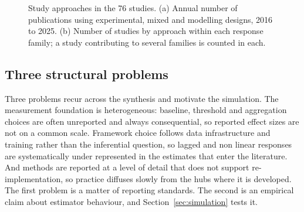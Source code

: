 \begin{figure}[H]\centering
{}\hfill{}
\caption{Study approaches in the 76 studies. (a) Annual number of publications using experimental, mixed and modelling designs, 2016 to 2025. (b) Number of studies by approach within each response family; a study contributing to several families is counted in each.}
\label{fig:approaches}
\end{figure}

\subsection{Three structural problems}\label{sec:problems}

Three problems recur across the synthesis and motivate the simulation. The measurement foundation is heterogeneous: baseline, threshold and aggregation choices are often unreported and always consequential, so reported effect sizes are not on a common scale. Framework choice follows data infrastructure and training rather than the inferential question, so lagged and non linear responses are systematically under represented in the estimates that enter the literature. And methods are reported at a level of detail that does not support re-implementation, so practice diffuses slowly from the hubs where it is developed. The first problem is a matter of reporting standards. The second is an empirical claim about estimator behaviour, and Section~\ref{sec:simulation} tests it.
